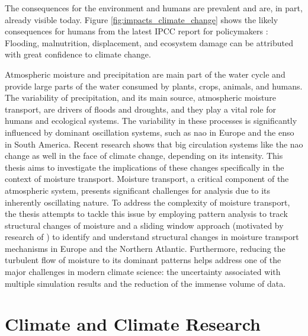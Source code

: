 The consequences for the environment and humans are prevalent and are, in part, already visible today. 
Figure \ref{fig:impacts_climate_change} shows the likely consequences for humans from the latest IPCC report for policymakers \cite{lee2024climate}: Flooding, malnutrition, displacement, and ecosystem damage can be attributed with great confidence to climate change. 

Atmospheric moisture and precipitation are main part of the water cycle and provide large parts of the water consumed by plants, crops, animals, and humans. 
The variability of precipitation, and its main source, atmospheric moisture transport, are drivers of floods and droughts, and they play a vital role for humans and ecological systems.  
The variability in these processes is significantly influenced by dominant oscillation systems, such as \ac{nao} in Europe and the \ac{enso} in South America.
Recent research shows that big circulation systems like the \ac{nao} \cite{vietinghoff_visual_2021} change as well in the face of climate change, depending on its intensity.  
This thesis aims to investigate the implications of these changes specifically in the context of moisture transport.
Moisture transport, a critical component of the atmospheric system, presents significant challenges for analysis due to its inherently oscillating nature.
To address the complexity of moisture transport, the thesis attempts to tackle this issue by employing pattern analysis to track structural changes of moisture and a sliding window approach (motivated by research of \cite{vietinghoff_visual_2021}) to identify and understand structural changes in moisture transport mechanisms in Europe and the Northern Atlantic. 
Furthermore, reducing the turbulent flow of moisture to its dominant patterns helps address one of the major challenges in modern climate science: the uncertainty associated with multiple simulation results and the reduction of the immense volume of data.




\section{Climate and Climate Research}
\label{sec:climate}



